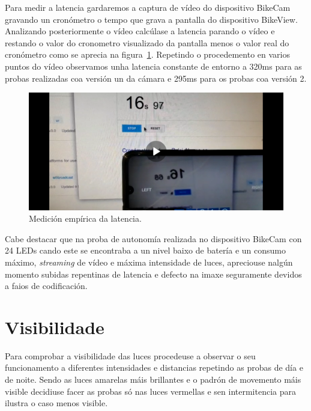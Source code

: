 Para medir a latencia gardaremos a captura de vídeo do dispositivo BikeCam gravando un cronómetro o tempo que grava a pantalla do dispositivo BikeView. Analizando posteriormente o vídeo calcúlase a latencia parando o vídeo e restando o valor do cronometro visualizado da pantalla menos o valor real do cronómetro como se aprecia na figura~\ref{fig:latencia}. Repetindo o procedemento en varios puntos do vídeo observamos unha latencia constante de entorno a 320ms para as probas realizadas coa versión un da cámara e 295ms para os probas coa versión 2.
\begin{figure}[tbp]
  \centering
  \includegraphics[scale=0.1]{imaxes/latencia.png}
  \caption{Medición empírica da latencia.}
  \label{fig:latencia}
\end{figure}
Cabe destacar que na proba de autonomía realizada no dispositivo BikeCam con 24 LEDs cando este se encontraba a un nivel baixo de batería e un consumo máximo, \emph{streaming} de vídeo e máxima intensidade de luces, apreciouse nalgún momento subidas repentinas de latencia e defecto na imaxe seguramente devidos a faios de codificación.

\section{Visibilidade}
Para comprobar a visibilidade das luces procedeuse a observar o seu funcionamento a diferentes intensidades e distancias repetindo as probas de día e de noite. Sendo as luces amarelas máis brillantes e o padrón de movemento máis visible decidiuse facer as probas só nas luces vermellas e sen intermitencia para ilustra o caso menos visible.

